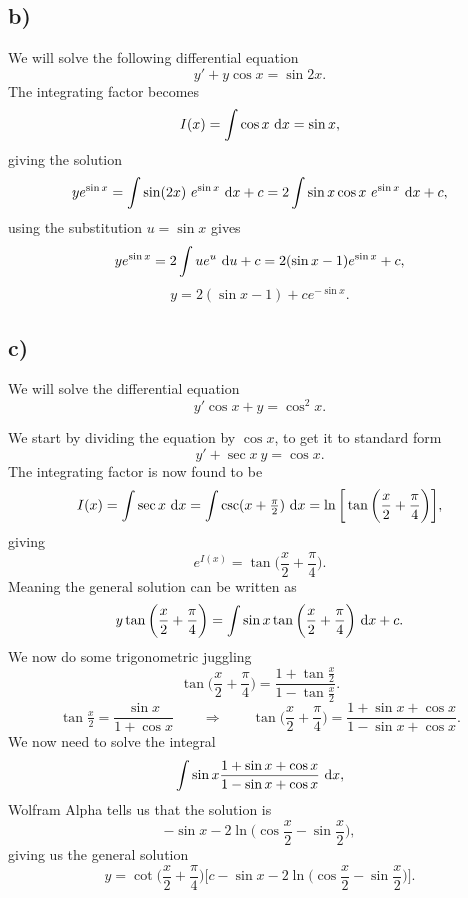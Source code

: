 \documentclass[a4paper, 11pt, titlepage, english]{article}
\renewcommand{\d}{{\rm d}}
\begin{document}
\subsection*{b)}
We will solve the following differential equation
$$y' + y\cos x = \sin 2x.$$
The integrating factor becomes
$$I(x) = \int \cos x \ \d x = \sin x,$$
giving the solution
$$ye^{\sin x} = \int \sin (2 x)\ e^{\sin x}\ \d x + c = 2\int \sin x \cos x\  e^{\sin x} \ \d x + c,$$
using the substitution $u = \sin x$ gives
$$y e^{\sin x} = 2\int u e^{u} \ \d u + c = 2(\sin x -1) e^{\sin x} + c,$$
$$y = 2(\sin x -1) + ce^{-\sin x}.$$

\subsection*{c)}
We will solve the differential equation
$$y'\cos x + y = \cos^2 x.$$

We start by dividing the equation by $\cos x$, to get it to standard form
$$y' + \sec x\ y = \cos x.$$
The integrating factor is now found to be
$$I(x) = \int \sec x \ \d x = \int \csc (x + \tfrac{\pi}{2}) \ \d x = \ln \bigg[\tan\bigg(\frac{x}{2} + \frac{\pi}{4}\bigg)\bigg],$$
giving
$$e^{I(x)} = \tan\bigg(\frac{x}{2} + \frac{\pi}{4}\bigg).$$
Meaning the general solution can be written as
$$y \tan\bigg(\frac{x}{2} + \frac{\pi}{4}\bigg) = \int \sin x \tan\bigg(\frac{x}{2} + \frac{\pi}{4}\bigg) \ \d x + c.$$
We now do some trigonometric juggling
$$\tan\bigg(\frac{x}{2} + \frac{\pi}{4}\bigg) = \frac{1 + \tan \tfrac{x}{2}}{1 - \tan\tfrac{x}{2}}.$$
$$\tan \tfrac{x}{2} = \frac{\sin x}{1 + \cos x} \qquad \Rightarrow \qquad \tan\bigg(\frac{x}{2} + \frac{\pi}{4}\bigg) = \frac{1 + \sin x + \cos x}{1 -\sin x + \cos x}.$$
We now need to solve the integral
$$\int \sin x \frac{1 + \sin x + \cos x}{1 -\sin x + \cos x} \ \d x, $$
Wolfram Alpha tells us that the solution is
$$-\sin x - 2\ln\bigg(\cos\frac{x}{2} - \sin \frac{x}{2}\bigg),$$
giving us the general solution
$$y = \cot\bigg(\frac{x}{2} + \frac{\pi}{4}\bigg)\bigg[c - \sin x - 2\ln\bigg(\cos\frac{x}{2} - \sin \frac{x}{2} \bigg)\bigg].$$
\end{document}
